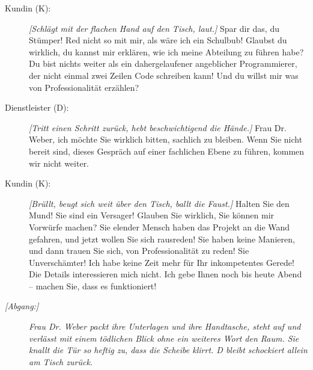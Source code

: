 \begin{description}
    \item[Kundin (K):] \textit{[Schlägt mit der flachen Hand auf den Tisch, laut.]} Spar dir das, du Stümper! Red nicht so mit mir, als wäre ich ein Schulbub! Glaubst du wirklich, du kannst mir erklären, wie ich meine Abteilung zu führen habe? Du bist nichts weiter als ein dahergelaufener angeblicher Programmierer, der nicht einmal zwei Zeilen Code schreiben kann! Und du willst mir was von Professionalität erzählen?
    
    \item[Dienstleister (D):] \textit{[Tritt einen Schritt zurück, hebt beschwichtigend die Hände.]} Frau Dr. Weber, ich möchte Sie wirklich bitten, sachlich zu bleiben. Wenn Sie nicht bereit sind, dieses Gespräch auf einer fachlichen Ebene zu führen, kommen wir nicht weiter.
    
    \item[Kundin (K):] \textit{[Brüllt, beugt sich weit über den Tisch, ballt die Faust.]} Halten Sie den Mund! Sie sind ein Versager! Glauben Sie wirklich, Sie können mir Vorwürfe machen? Sie elender Mensch haben das Projekt an die Wand gefahren, und jetzt wollen Sie sich rausreden! Sie haben keine Manieren, und dann trauen Sie sich, von Professionalität zu reden! Sie Unverschämter! Ich habe keine Zeit mehr für Ihr inkompetentes Gerede! Die Details interessieren mich nicht. Ich gebe Ihnen noch bis heute Abend – machen Sie, dass es funktioniert!
    
    \item[\textit{[Abgang:]}] \textit{Frau Dr. Weber packt ihre Unterlagen und ihre Handtasche, steht auf und verlässt mit einem tödlichen Blick ohne ein weiteres Wort den Raum. Sie knallt die Tür so heftig zu, dass die Scheibe klirrt. D bleibt schockiert allein am Tisch zurück.}
\end{description}

